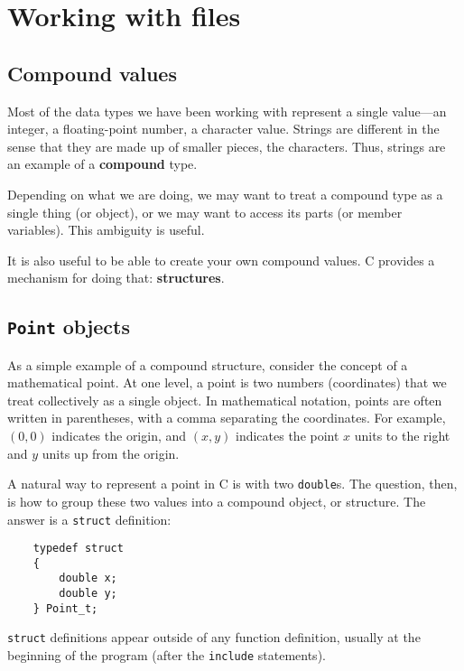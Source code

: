 
\chapter{Working with files}
\label{structs}

\section{Compound values}

Most of the data types we have been working with represent a single
value---an integer, a floating-point number, a character value. 
Strings are different in the sense that they are made up of smaller
pieces, the characters.  Thus, strings are an example of a
{\bf compound} type. 

Depending on what we are doing, we may want to treat a compound type
as a single thing (or object), or we may want to access its parts (or
member variables).  This ambiguity is useful.

It is also useful to be able to create your own compound values.  
C provides a mechanism for doing that: {\bf structures}.  

\section{{\tt Point} objects}

As a simple example of a compound structure, consider the concept of a
mathematical point.  At one level, a point is two numbers
(coordinates) that we treat collectively as a single object.  In
mathematical notation, points are often written in parentheses, with a
comma separating the coordinates.  For example, $(0, 0)$ indicates the
origin, and $(x, y)$ indicates the point $x$ units to the right and
$y$ units up from the origin.

A natural way to represent a point in C is with two {\tt double}s.
The question, then, is how to group these two values into
a compound object, or structure.  The answer is a {\tt struct}
definition:

\begin{verbatim}
	typedef struct 
	{
		double x;
		double y;
	} Point_t;  
\end{verbatim}
%
{\tt struct} definitions appear outside of any function definition,
usually at the beginning of the program (after the {\tt include}
statements).

